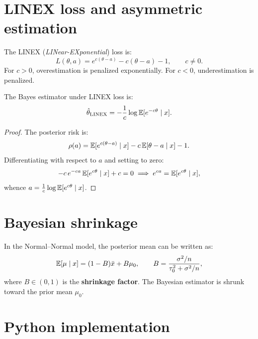 \section{LINEX loss and asymmetric estimation}

\begin{definition}
The LINEX (\textit{LINear-EXponential}) loss is:
\[
  L(\theta, a) = e^{c(\theta - a)} - c(\theta - a) - 1, \qquad c \neq 0.
\]
For $c > 0$, overestimation is penalized exponentially. For $c < 0$,
underestimation is penalized.
\end{definition}

\begin{theorem}
The Bayes estimator under LINEX loss is:
\[
  \hat{\theta}_{\text{LINEX}} = -\frac{1}{c}\log \mathbb{E}[e^{-c\theta} \mid x].
\]
\end{theorem}

\begin{proof}
The posterior risk is:
\[
  \rho(a) = \mathbb{E}[e^{c(\theta-a)} \mid x] - c\,\mathbb{E}[\theta - a \mid x] - 1.
\]
Differentiating with respect to $a$ and setting to zero:
\[
  -c\,e^{-ca}\,\mathbb{E}[e^{c\theta} \mid x] + c = 0
  \implies e^{ca} = \mathbb{E}[e^{c\theta} \mid x],
\]
whence $a = \frac{1}{c}\log \mathbb{E}[e^{c\theta} \mid x]$.
\end{proof}

\section{Bayesian shrinkage}

\begin{proposition}
In the Normal--Normal model, the posterior mean can be written as:
\[
  \mathbb{E}[\mu \mid x] = (1 - B)\bar{x} + B\mu_0,
  \qquad B = \frac{\sigma^2/n}{\tau_0^2 + \sigma^2/n},
\]
where $B \in (0,1)$ is the \textbf{shrinkage factor}. The Bayesian
estimator is shrunk toward the prior mean $\mu_0$.
\end{proposition}

\section{Python implementation}

